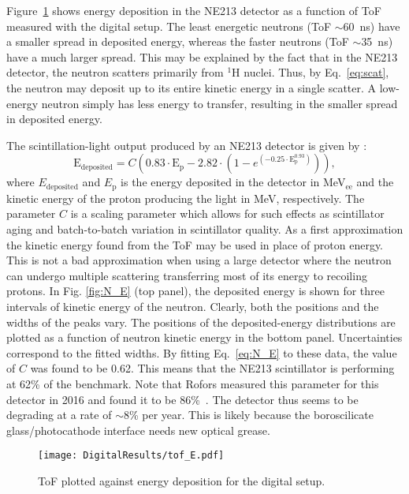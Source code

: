 \documentclass[main.tex]{subfiles}
\begin{document}
Figure~\ref{fig:tof_E_d} shows energy deposition in the NE213 detector as a function of ToF measured with the digital setup. 
The least energetic neutrons (ToF $\sim$\SI{60}{ns}) have a smaller spread in deposited energy, whereas the faster neutrons (ToF $\sim$\SI{35}{ns}) have a much larger spread. 
This may be explained by the fact that in the NE213 detector, the neutron scatters primarily from $^1$H nuclei. Thus, by Eq.~\ref{eq:scat}, the neutron may deposit up to its entire kinetic energy in a single scatter. A low-energy neutron simply has less energy to transfer, resulting in the smaller spread in deposited energy.

The scintillation-light output produced by an NE213 detector is given by \cite{Cecil}:
\begin{equation}
	\textrm{E}_\textrm{deposited} = C\left(  0.83\cdot \textrm{E}_\textrm{p} - 2.82\cdot\left(  1 - e^{(-0.25\cdot \textrm{E}_\textrm{p}^{0.93})}  \right)  \right),
	\label{eq:N_E}
\end{equation}
where $E_\textrm{deposited}$ and $E_\textrm{p}$ is the energy deposited in the detector in \si{MeV}$_\textrm{ee}$ and the kinetic energy of the proton producing the light in \si{MeV}, respectively. The parameter $C$ is a scaling parameter which allows for such effects as scintillator aging and batch-to-batch variation in scintillator quality. As a first approximation the kinetic energy found from the ToF may be used in place of proton energy. This is not a bad approximation when using a large detector where the neutron can undergo multiple scattering transferring most of its energy to recoiling protons.
In Fig. \ref{fig:N_E} (top panel), the deposited energy is shown for three intervals of kinetic energy of the neutron.
Clearly, both the positions and the widths of the peaks vary. 
The positions of the deposited-energy distributions are plotted as a function of neutron kinetic energy in the bottom panel. Uncertainties correspond to the fitted widths. 
By fitting Eq.~\ref{eq:N_E} to these data, the value of $C$ was found to be 0.62.  This means that the NE213 scintillator is performing at 62\% of the benchmark. Note that Rofors measured this parameter for this detector in 2016 and found it to be 86\%~\cite{Rofors}. The detector thus seems to be degrading at a rate of $\sim$8\% per year. This is likely because the boroscilicate glass/photocathode interface needs new optical grease.

\begin{figure}[ht]
    \centering
        \texttt{[image: DigitalResults/tof\_E.pdf]}
        \caption[ToF plotted against energy deposition for the digital setup.]{ToF plotted against energy deposition for the digital setup.}
    \label{fig:tof_E_d} 
\end{figure}
\end{document}
